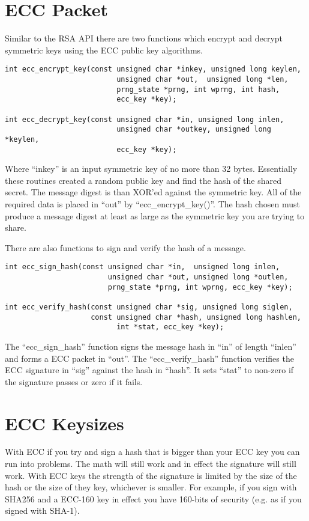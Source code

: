 \documentclass{book}
\begin{document}
\section{ECC Packet}
Similar to the RSA API there are two functions which encrypt and decrypt symmetric keys using the ECC public key
algorithms.
\begin{verbatim}
int ecc_encrypt_key(const unsigned char *inkey, unsigned long keylen,
                          unsigned char *out,  unsigned long *len, 
                          prng_state *prng, int wprng, int hash, 
                          ecc_key *key);

int ecc_decrypt_key(const unsigned char *in, unsigned long inlen,
                          unsigned char *outkey, unsigned long *keylen, 
                          ecc_key *key);
\end{verbatim}

Where ``inkey'' is an input symmetric key of no more than 32 bytes.  Essentially these routines created a random public key
and find the hash of the shared secret.  The message digest is than XOR'ed against the symmetric key.  All of the required
data is placed in ``out'' by ``ecc\_encrypt\_key()''.   The hash chosen must produce a message digest at least as large
as the symmetric key you are trying to share.

There are also functions to sign and verify the hash of a message.
\begin{verbatim}
int ecc_sign_hash(const unsigned char *in,  unsigned long inlen,
                        unsigned char *out, unsigned long *outlen,
                        prng_state *prng, int wprng, ecc_key *key);

int ecc_verify_hash(const unsigned char *sig, unsigned long siglen,
                    const unsigned char *hash, unsigned long hashlen, 
                          int *stat, ecc_key *key);
\end{verbatim}

The ``ecc\_sign\_hash'' function signs the message hash in ``in'' of length ``inlen'' and forms a ECC packet in ``out''.  
The ``ecc\_verify\_hash'' function verifies the ECC signature in ``sig'' against the hash in ``hash''.  It sets ``stat''
to non-zero if the signature passes or zero if it fails.


\section{ECC Keysizes}
With ECC if you try and sign a hash that is bigger than your ECC key you can run into problems.  The math will still work
and in effect the signature will still work.  With ECC keys the strength of the signature is limited by the size of
the hash or the size of they key, whichever is smaller.  For example, if you sign with SHA256 and a ECC-160 key in effect
you have 160-bits of security (e.g. as if you signed with SHA-1).  
\end{document}
